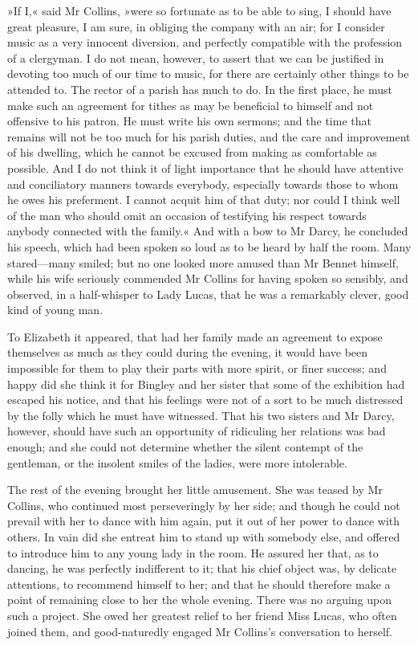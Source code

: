 »If I,« said Mr Collins, »were so fortunate as to be able to sing, I should have great pleasure, I am sure, in obliging the company with an air; for I consider music as a very innocent diversion, and perfectly compatible with the profession of a clergyman. I do not mean, however, to assert that we can be justified in devoting too much of our time to music, for there are certainly other things to be attended to. The rector of a parish has much to do. In the first place, he must make such an agreement for tithes as may be beneficial to himself and not offensive to his patron. He must write his own sermons; and the time that remains will not be too much for his parish duties, and the care and improvement of his dwelling, which he cannot be excused from making as comfortable as possible. And I do not think it of light importance that he should have attentive and conciliatory manners towards everybody, especially towards those to whom he owes his preferment. I cannot acquit him of that duty; nor could I think well of the man who should omit an occasion of testifying his respect towards anybody connected with the family.« And with a bow to Mr Darcy, he concluded his speech, which had been spoken so loud as to be heard by half the room. Many stared—many smiled; but no one looked more amused than Mr Bennet himself, while his wife seriously commended Mr Collins for having spoken so sensibly, and observed, in a half-whisper to Lady Lucas, that he was a remarkably clever, good kind of young man.

To Elizabeth it appeared, that had her family made an agreement to expose themselves as much as they could during the evening, it would have been impossible for them to play their parts with more spirit, or finer success; and happy did she think it for Bingley and her sister that some of the exhibition had escaped his notice, and that his feelings were not of a sort to be much distressed by the folly which he must have witnessed. That his two sisters and Mr Darcy, however, should have such an opportunity of ridiculing her relations was bad enough; and she could not determine whether the silent contempt of the gentleman, or the insolent smiles of the ladies, were more intolerable.

The rest of the evening brought her little amusement. She was teased by Mr Collins, who continued most perseveringly by her side; and though he could not prevail with her to dance with him again, put it out of her power to dance with others. In vain did she entreat him to stand up with somebody else, and offered to introduce him to any young lady in the room. He assured her that, as to dancing, he was perfectly indifferent to it; that his chief object was, by delicate attentions, to recommend himself to her; and that he should therefore make a point of remaining close to her the whole evening. There was no arguing upon such a project. She owed her greatest relief to her friend Miss Lucas, who often joined them, and good-naturedly engaged Mr Collins's conversation to herself.

